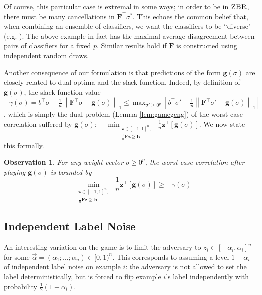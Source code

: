 \documentclass{colt2015} %
\newtheorem{obs}[thm]{Observation}
\newcommand{\vF}{\mathbf{F}}
\newcommand{\vb}{\mathbf{b}}
\newcommand{\vg}{\mathbf{g}}
\newcommand{\vz}{\mathbf{z}}
\newcommand{\vnorm}[1]{\left\lVert#1\right\rVert} %
\newcommand{\zbr}{\textsc{ZBR}}
\begin{document}
Of course, this particular case is extremal in some ways; in order to be in $\zbr$, 
there must be many cancellations in $\vF^\top \sigma^*$. 
This echoes the common belief that, when combining an ensemble of classifiers, 
we want the classifiers to be ``diverse" (e.g. \cite{K03}). 
The above example in fact has the maximal average disagreement between pairs of classifiers for a fixed $p$. 
Similar results hold if $\vF$ is constructed using independent random draws.


Another consequence of our formulation 
is that predictions of the form $\vg (\sigma)$ 
are closely related to dual optima and the slack function. 
Indeed, by definition of $\vg (\sigma)$, the slack function value 
$ - \gamma (\sigma) = b^\top \sigma - \frac{1}{n} \vnorm{\vF^\top \sigma - \vg (\sigma)}_1 
\leq \max_{\sigma' \geq 0^p} \left[ b^\top \sigma' - \frac{1}{n} \vnorm{\vF^\top \sigma' - \vg (\sigma)}_1 \right]$, 
which is simply the dual problem (Lemma \ref{lem:gamegeng}) of the worst-case correlation suffered by $\vg (\sigma)$: 
$\displaystyle \quad \min_{\substack{ \vz \in [-1,1]^n , \\ \frac{1}{n} \vF \vz \geq \vb }} \;\frac{1}{n} \vz^\top [\vg (\sigma)]$. 
We now state this formally.

\begin{obs}
\label{obs:slacksubopt}
For any weight vector $\sigma \geq 0^p$, 
the worst-case correlation after playing $\vg (\sigma)$ is bounded by 
$$ \quad \min_{\substack{ \vz \in [-1,1]^n , \\ \frac{1}{n} \vF \vz \geq \vb }} \;\frac{1}{n} \vz^\top [\vg (\sigma)] 
\geq - \gamma (\sigma) $$
\end{obs}




\subsection{Independent Label Noise}

An interesting variation on the game is to limit the adversary to 
$z_i \in [-\alpha_i,\alpha_i]^n$ for some $\vec{\alpha} = (\alpha_1 ; \dots ; \alpha_n) \in [0,1)^n$. 
This corresponds to assuming a level $1 - \alpha_i$ of independent label noise on example $i$: 
the adversary is not allowed to set the label deterministically, 
but is forced to flip example $i$'s label independently 
with probability $\frac{1}{2}(1 - \alpha_i)$. 
\end{document}
